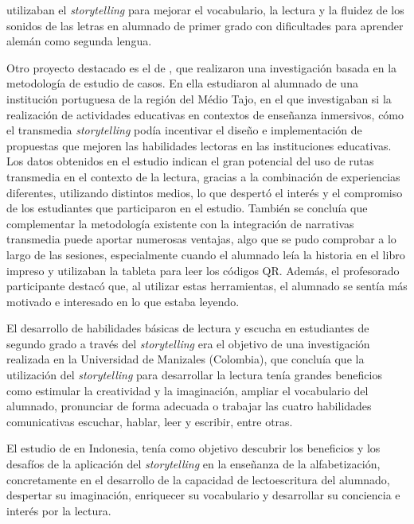 \documentclass[spanish]{textolivre}
\begin{document}
\textcite{barwasser_storytelling_2021} utilizaban el \textit{storytelling} para mejorar el vocabulario, la lectura y la fluidez de los sonidos de las letras en alumnado de primer grado con dificultades para aprender alemán como segunda lengua.

Otro proyecto destacado es el de \textcite{ferreira_motivating_2021}, que realizaron una investigación basada en la metodología de estudio de casos. En ella estudiaron al alumnado de una institución portuguesa de la región del Médio Tajo, en el que investigaban si la realización de actividades educativas en contextos de enseñanza inmersivos, cómo el transmedia \textit{storytelling} podía incentivar el diseño e implementación de propuestas que mejoren las habilidades lectoras en las instituciones educativas. Los datos obtenidos en el estudio indican el gran potencial del uso de rutas transmedia en el contexto de la lectura, gracias a la combinación de experiencias diferentes, utilizando distintos medios, lo que despertó el interés y el compromiso de los estudiantes que participaron en el estudio. También se concluía que complementar la metodología existente con la integración de narrativas transmedia puede aportar numerosas ventajas, algo que se pudo comprobar a lo largo de las sesiones, especialmente cuando el alumnado leía la historia en el libro impreso y utilizaban la tableta para leer los códigos QR. Además, el profesorado participante destacó que, al utilizar estas herramientas, el alumnado se sentía más motivado e interesado en lo que estaba leyendo.

El desarrollo de habilidades básicas de lectura y escucha en estudiantes de segundo grado a través del \textit{storytelling} \cite{lopez_tangarife_desarrollo_2013} era el objetivo de una investigación realizada en la Universidad de Manizales (Colombia), que concluía que la utilización del \textit{storytelling} para desarrollar la lectura tenía grandes beneficios como estimular la creatividad y la imaginación, ampliar el vocabulario del alumnado, pronunciar de forma adecuada o trabajar las cuatro habilidades comunicativas escuchar, hablar, leer y escribir, entre otras.

El estudio de \textcite{satriani_storytelling_2019} en Indonesia, tenía como objetivo descubrir los beneficios y los desafíos de la aplicación del \textit{storytelling} en la enseñanza de la alfabetización, concretamente en el desarrollo de la capacidad de lectoescritura del alumnado, despertar su imaginación, enriquecer su vocabulario y desarrollar su conciencia e interés por la lectura. 
\end{document}
